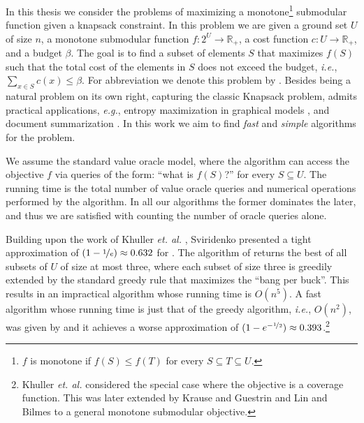 In this thesis we consider the problems of maximizing a monotone\footnote{
    $f$ is monotone if $f(S) \leq f(T)$ for every $S \subseteq T \subseteq U$.
} submodular function given a knapsack constraint.
In this problem we are given a ground set
$U$ of size $n$, a monotone submodular function $f:2^U \to \mathbb{R}_+$, a cost function $c:U \to \mathbb{R}_+$, and a budget $\beta$.
The goal is to find a subset of elements $S$ that maximizes $f(S)$ such that the total cost of the elements in $S$ does not exceed the budget, {\em i.e.}, $\sum _{x\in S}c(x)\leq \beta$.
For abbreviation we denote this problem by \SK.
Besides being a natural problem on its own right, capturing the classic Knapsack problem, \SK admits practical applications, {\em e.g.}, entropy maximization in graphical models \cite{krause2005note}, and document summarization \cite{LB10}.
In this work we aim to find {\em fast} and {\em simple} algorithms for the \SK problem.

We assume the standard value oracle model, where the algorithm can access the objective $f$ via queries of the form: ``what is $f(S)$?'' for every $S\subseteq U$.
The running time is the total number of value oracle queries and numerical operations performed by the algorithm. In all our algorithms the former dominates the later, and thus we are satisfied with counting the number of oracle queries alone.

Building upon the work of Khuller {\em et. al.} \cite{khuller1999budgeted}, Sviridenko \cite{sviridenko2004note} presented a tight approximation of $(1-\nicefrac[]{1}{e})\approx 0.632$ for \SK.
The algorithm of \cite{sviridenko2004note} returns the best of all subsets of $U$ of size at most three, where each subset of size three is greedily extended by the standard greedy rule that maximizes the ``bang per buck''.
This results in an impractical algorithm whose running time is $O(n^5)$.
A fast algorithm whose running time is just that of the greedy algorithm, {\em i.e.}, $O(n^2)$, was given by \cite{khuller1999budgeted} and it achieves a worse approximation of $(1-e^{-\nicefrac[]{1}{2}})\approx 0.393$.\footnote{Khuller {\em et. al.} \cite{khuller1999budgeted} considered the special case where the objective is a coverage function. This was later extended by Krause and Guestrin \cite{krause2005note} and Lin and Bilmes \cite{LB10} to a general monotone submodular objective.}


